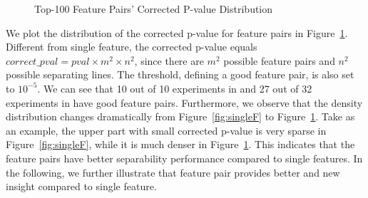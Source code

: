 \begin{figure}[h]
\centering     %
\vspace{-5mm}
\vspace{-5mm}
\caption{Top-100 Feature Pairs' Corrected P-value Distribution}
\vspace{-5mm}
\label{fig:FP}
\end{figure}

 We plot the distribution of the corrected p-value for \topk feature pairs in Figure~\ref{fig:FP}. Different from single feature, the corrected p-value equals $correct\_pval = pval\times m^2 \times n^2$, since there are $m^2$ possible feature pairs and $n^2$ possible separating lines. The threshold, defining a good feature pair, is also set to $10^{-5}$. We can see that 10 out of 10 experiments in \msig and 27 out of 32 experiments in \lincs have good feature pairs. Furthermore, we observe that the density distribution changes dramatically from Figure~\ref{fig:singleF} to Figure~\ref{fig:FP}. Take \lincs as an example, the upper part with small corrected p-value is very sparse in Figure~\ref{fig:singleF}, while it is much denser in Figure~\ref{fig:FP}. This indicates that the \topk feature pairs have better separability performance compared to single features. In the following, we further illustrate that feature pair provides better and new insight compared to single feature. 

